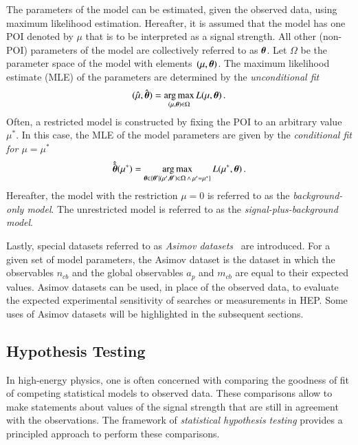 The parameters of the model can be estimated, given the observed data, using
maximum likelihood estimation. Hereafter, it is assumed that the model has one
POI denoted by $\mu$ that is to be interpreted as a signal strength. All other
(non-POI) parameters of the model are collectively referred to as
$\myvec{\theta}$. Let $\Omega$ be the parameter space of the model with
elements~$(\mu, \myvec{\theta})$. The maximum likelihood estimate (MLE) of the
parameters are determined by the \emph{unconditional fit}
\begin{align}
  (\muhat, \hat{\myvec{\theta}}) = \argmax_{(\mu, \myvec{\theta}) \in \Omega} L(\mu, \myvec{\theta}) \,\text{.}
  \label{eq:unconditional_fit}
\end{align}
Often, a restricted model is constructed by fixing the POI to an arbitrary value
$\mu^*$. In this case, the MLE of the model parameters are given by the
\emph{conditional fit for $\mu = \mu^*$}
\begin{align}
  \hat{\hat{\myvec{\theta}}}(\mu^*) = \argmax_{\myvec{\theta} \in \{ \myvec{\theta}^\prime \mid (\mu^\prime, \myvec{\theta}^\prime) \in \Omega \,\land\, \mu^\prime = \mu^* \} } L(\mu^*, \myvec{\theta}) \,\text{.}
  \label{eq:conditional_fit}
\end{align}
Hereafter, the model with the restriction $\mu = 0$ is referred to as the
\emph{background-only model}. The unrestricted model is referred to as the
\emph{signal-plus-background model}.

Lastly, special datasets referred to as \emph{Asimov
  datasets}~\cite{Cowan:2010js} are introduced. For a given set of model
parameters, the Asimov dataset is the dataset in which the observables $n_{cb}$
and the global observables $a_p$ and $m_{cb}$ are equal to their expected
values. Asimov datasets can be used, in place of the observed data, to evaluate
the expected experimental sensitivity of searches or measurements in HEP. Some
uses of Asimov datasets will be highlighted in the subsequent sections.


\subsection{Hypothesis Testing}%
\label{sec:hypotesting}

In high-energy physics, one is often concerned with comparing the goodness of
fit of competing statistical models to observed data. These comparisons allow to
make statements about values of the signal strength that are still in agreement
with the observations. The framework of \emph{statistical hypothesis testing}
provides a principled approach to perform these comparisons.

